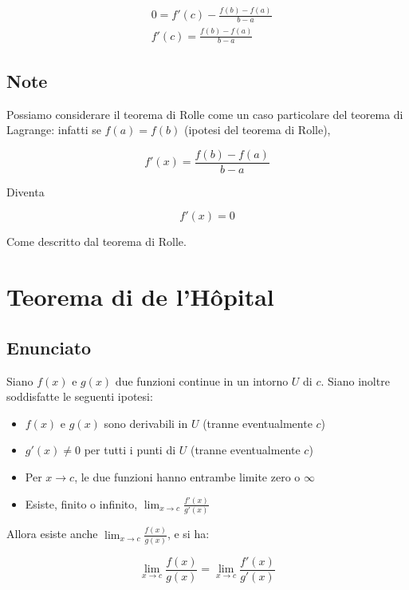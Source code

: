 \documentclass{article}
\begin{document}
\begin{align}
    & 0 = f'(c) -\frac{f(b)-f(a)}{b-a} \\
    & f'(c) = \frac{f(b)-f(a)}{b-a}
\end{align}

\subsection{Note}

Possiamo considerare il teorema di Rolle come un caso particolare del teorema di Lagrange: infatti se $f(a) = f(b)$ (ipotesi del teorema di Rolle), 

\begin{equation}
    f'(x) = \frac{f(b)-f(a)}{b-a}
\end{equation}

Diventa 

\begin{equation}
    f'(x) = 0
\end{equation}

Come descritto dal teorema di Rolle. 

\section{Teorema di de l'H\^opital}

\subsection{Enunciato}

Siano $f(x)$ e $g(x)$ due funzioni continue in un intorno $U$ di $c$. Siano inoltre soddisfatte le seguenti ipotesi:
\begin{itemize}
    \item $f(x)$ e $g(x)$ sono derivabili in $U$ (tranne eventualmente $c$)
    \item $g'(x) \neq 0$ per tutti i punti di $U$ (tranne eventualmente $c$)
    \item Per $x\rightarrow c$, le due funzioni hanno entrambe limite zero o $\infty$
    \item Esiste, finito o infinito, $\lim_{x\rightarrow c} \frac{f'(x)}{g'(x)}$
\end{itemize}

Allora esiste anche $\lim_{x\rightarrow c} \frac{f(x)}{g(x)}$, e si ha:

\begin{equation}
    \lim_{x\rightarrow c} \frac{f(x)}{g(x)} = \lim_{x\rightarrow c} \frac{f'(x)}{g'(x)}
\end{equation}
\end{document}

